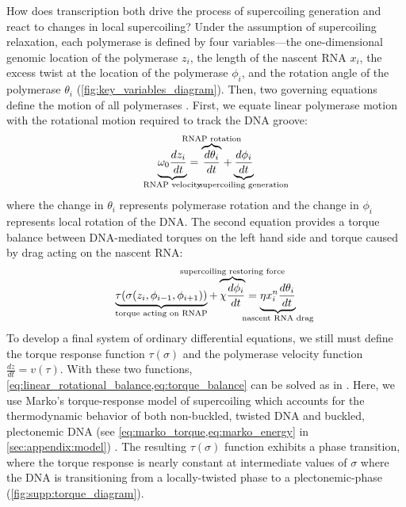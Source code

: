 \documentclass[11pt]{article}
\begin{document}
How does transcription both drive the process of supercoiling generation and react to changes in local supercoiling? Under the assumption of supercoiling relaxation, each polymerase is defined by four variables---the one-dimensional genomic location of the polymerase \(z_i\), the length of the nascent RNA \(x_i\), the excess twist at the location of the polymerase \(\phi_i\), and the rotation angle of the polymerase \(\theta_i\) (\cref{fig:key_variables_diagram}). Then, two governing equations define the motion of all polymerases \parencite{sevierPropertiesGeneExpression2018}. First, we equate linear polymerase motion with the rotational motion required to track the DNA groove:
\begin{equation}
    \underbrace{\omega_0 \frac{dz_i}{dt}}_{\mathclap{\text{RNAP velocity}}} = \overbrace{\frac{d\theta_i}{dt}}^{\mathclap{\text{RNAP rotation}}} + \underbrace{\frac{d\phi_i}{dt}}_{\mathclap{\text{supercoiling generation}}}
\label{eq:linear_rotational_balance}
\end{equation}
where the change in \(\theta_i\) represents polymerase rotation and the change in \(\phi_i\) represents local rotation of the DNA.
The second equation provides a torque balance between DNA-mediated torques on the left hand side and torque caused by drag acting on the nascent RNA:
\begin{equation}
    \underbrace{\tau(\sigma(z_i, \phi_{i-1}, \phi_{i+1}))}_{\mathclap{\text{torque acting on RNAP}}} + \overbrace{\chi \frac{d\phi_i}{dt}}^{\mathclap{\text{supercoiling restoring force}}}= \underbrace{\eta x_i^n \frac{d\theta_i}{dt}}_{\mathclap{\text{nascent RNA drag}}}
\label{eq:torque_balance}
\end{equation}
To develop a final system of ordinary differential equations, we still must define the torque response function \(\tau(\sigma)\) and the polymerase velocity function \(\frac{dz}{dt} = v(\tau)\). With these two functions, \cref{eq:linear_rotational_balance,eq:torque_balance} can be solved as in \textcite{sevierPropertiesGeneExpression2018}. Here, we use Marko's torque-response model of supercoiling which accounts for the thermodynamic behavior of both non-buckled, twisted DNA and buckled, plectonemic DNA (see \cref{eq:marko_torque,eq:marko_energy} in \cref{sec:appendix:model}) \parencite{markoTorqueDynamicsLinking2007}. The resulting \(\tau(\sigma)\) function exhibits a phase transition, where the torque response is nearly constant at intermediate values of \(\sigma\) where the DNA is transitioning from a locally-twisted phase to a plectonemic-phase (\cref{fig:supp:torque_diagram}).
\end{document}
